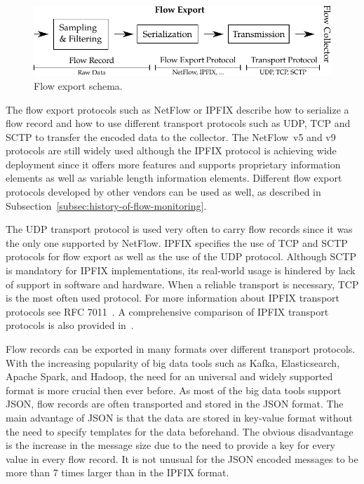 \begin{figure}[ht!]
  \begin{center}
    \includegraphics[width=\textwidth]{figures/flow-export}
  \end{center}
  \caption{Flow export schema.}
  \label{fig:flow-export}
\end{figure}

The flow export protocols such as NetFlow or IPFIX describe how to serialize a flow record and how to use different transport protocols such as UDP, TCP and SCTP to transfer the encoded data to the collector. The NetFlow~v5 and v9 protocols are still widely used although the IPFIX protocol is achieving wide deployment since it offers more features and supports proprietary information elements as well as variable length information elements. Different flow export protocols developed by other vendors can be used as well, as described in Subsection~\ref{subsec:history-of-flow-monitoring}.

The UDP transport protocol is used very often to carry flow records since it was the only one supported by NetFlow. IPFIX specifies the use of TCP and SCTP protocols for flow export as well as the use of the UDP protocol. Although SCTP is mandatory for IPFIX implementations, its real-world usage is hindered by lack of support in software and hardware. When a reliable transport is necessary, TCP is the most often used protocol. For more information about IPFIX transport protocols see RFC 7011~\cite{rfc7011}. A comprehensive comparison of IPFIX transport protocols is also provided in~\cite{Hofstede-2014-Flow}.

Flow records can be exported in many formats over different transport protocols. With the increasing popularity of big data tools such as Kafka, Elasticsearch, Apache Spark, and Hadoop, the need for an universal and widely supported format is more crucial then ever before. As most of the big data tools support JSON, flow records are often transported and stored in the JSON format. The main advantage of JSON is that the data are stored in key-value format without the need to specify templates for the data beforehand. The obvious disadvantage is the increase in the message size due to the need to provide a key for every value in every flow record. It is not unusual for the JSON encoded messages to be more than 7 times larger than in the IPFIX format.

